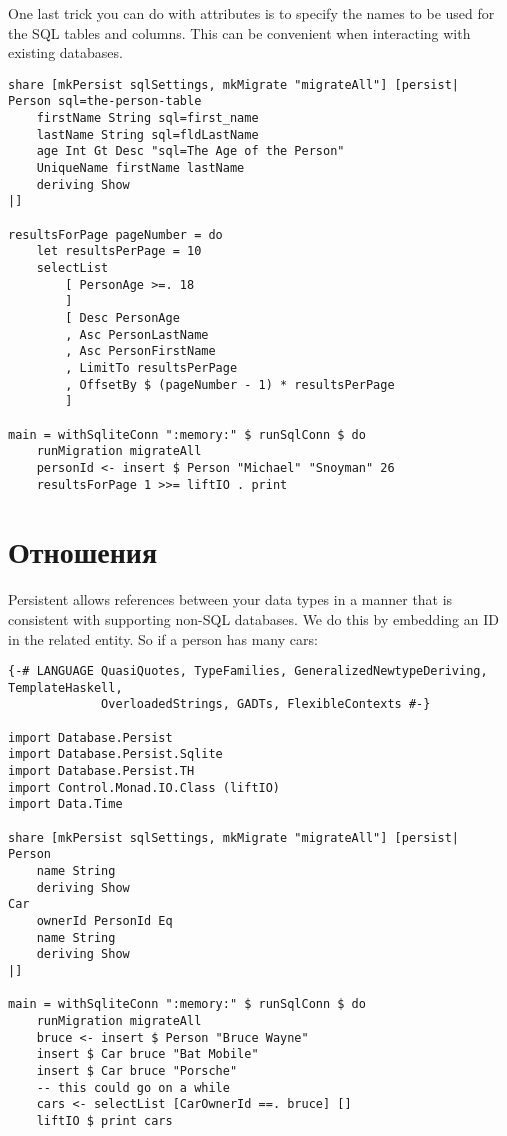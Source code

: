One last trick you can do with attributes is to specify the names to be used for the SQL tables and columns. This can be convenient when interacting with existing databases.

\begin{lstlisting}
share [mkPersist sqlSettings, mkMigrate "migrateAll"] [persist|
Person sql=the-person-table
    firstName String sql=first_name
    lastName String sql=fldLastName
    age Int Gt Desc "sql=The Age of the Person"
    UniqueName firstName lastName
    deriving Show
|]

resultsForPage pageNumber = do
    let resultsPerPage = 10
    selectList
        [ PersonAge >=. 18
        ]
        [ Desc PersonAge
        , Asc PersonLastName
        , Asc PersonFirstName
        , LimitTo resultsPerPage
        , OffsetBy $ (pageNumber - 1) * resultsPerPage
        ]

main = withSqliteConn ":memory:" $ runSqlConn $ do
    runMigration migrateAll
    personId <- insert $ Person "Michael" "Snoyman" 26
    resultsForPage 1 >>= liftIO . print
\end{lstlisting}%

\section{Отношения} %

Persistent allows references between your data types in a manner that is consistent with supporting non-SQL databases. We do this by embedding an ID in the related entity. So if a person has many cars:

\begin{lstlisting}
{-# LANGUAGE QuasiQuotes, TypeFamilies, GeneralizedNewtypeDeriving, TemplateHaskell,
             OverloadedStrings, GADTs, FlexibleContexts #-}

import Database.Persist
import Database.Persist.Sqlite
import Database.Persist.TH
import Control.Monad.IO.Class (liftIO)
import Data.Time

share [mkPersist sqlSettings, mkMigrate "migrateAll"] [persist|
Person
    name String
    deriving Show
Car
    ownerId PersonId Eq
    name String
    deriving Show
|]

main = withSqliteConn ":memory:" $ runSqlConn $ do
    runMigration migrateAll
    bruce <- insert $ Person "Bruce Wayne"
    insert $ Car bruce "Bat Mobile"
    insert $ Car bruce "Porsche"
    -- this could go on a while
    cars <- selectList [CarOwnerId ==. bruce] []
    liftIO $ print cars
\end{lstlisting}%
 
